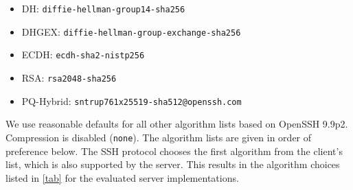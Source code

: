 \documentclass[sigconf,nonacm]{acmart}
\begin{document}
\begin{itemize}
    \item DH: \texttt{diffie-hellman-group14-sha256}
    \item DHGEX: \texttt{diffie-hellman-group-exchange-sha256}
    \item ECDH: \texttt{ecdh-sha2-nistp256}
    \item RSA: \texttt{rsa2048-sha256}
    \item PQ-Hybrid: \texttt{sntrup761x25519-sha512@openssh.com}
\end{itemize}

We use reasonable defaults for all other algorithm lists based on OpenSSH 9.9p2. Compression is disabled (\texttt{none}). The algorithm lists are given in order of preference below. The SSH protocol chooses the first algorithm from the client's list, which is also supported by the server. %
This results in the algorithm choices listed in \autoref{tab} for the evaluated server implementations.
\end{document}
